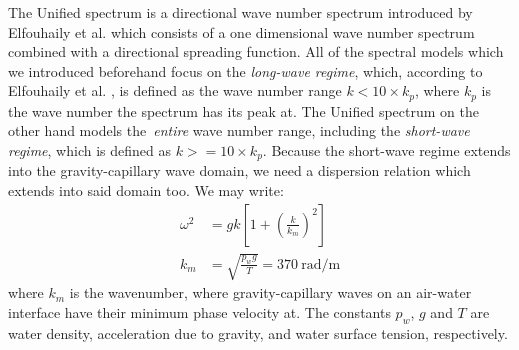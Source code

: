 %
The Unified spectrum is a directional wave number spectrum introduced by
Elfouhaily et al. \cite{article:Elfouhaily1997} which consists of a one 
dimensional wave number spectrum combined with a directional spreading 
function. All of the spectral models which we introduced beforehand focus on 
the \emph{long-wave regime}, which, according to Elfouhaily et al. 
\cite{article:Elfouhaily1997}, is defined as the wave number range $k < 
10\times k_p$, where $k_p$ is the wave number the spectrum has its peak at. The 
Unified spectrum on the other hand models the~\emph{entire} wave number 
range, including the \emph{short-wave regime}, which is defined as $k >= 
10\times k_p$. Because the short-wave regime extends into the gravity-capillary
wave domain, we need a dispersion relation which extends into said domain too.
We may write:
\begin{subequations}
\begin{align}
\omega^2 &= gk\left[1 + \left(\frac{k}{k_m}\right)^2\right] \\
k_m &= \sqrt{\frac{p_w g}{T}} = 370~\text{rad/m}
\end{align}
\end{subequations}
where $k_m$ is the wavenumber, where gravity-capillary waves on an air-water
interface have their minimum phase velocity at. The constants $p_w$, $g$ and
$T$ are water density, acceleration due to gravity, and water surface tension,
respectively.

